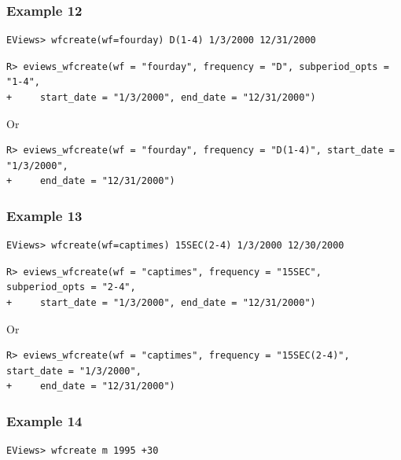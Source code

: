 \hypertarget{example-12-1}{%
\subsubsection{Example 12}\label{example-12-1}}

\begin{verbatim}
EViews> wfcreate(wf=fourday) D(1-4) 1/3/2000 12/31/2000
\end{verbatim}

\begin{verbatim}
R> eviews_wfcreate(wf = "fourday", frequency = "D", subperiod_opts = "1-4",
+     start_date = "1/3/2000", end_date = "12/31/2000")
\end{verbatim}

Or

\begin{verbatim}
R> eviews_wfcreate(wf = "fourday", frequency = "D(1-4)", start_date = "1/3/2000",
+     end_date = "12/31/2000")
\end{verbatim}

\hypertarget{example-13-1}{%
\subsubsection{Example 13}\label{example-13-1}}

\begin{verbatim}
EViews> wfcreate(wf=captimes) 15SEC(2-4) 1/3/2000 12/30/2000
\end{verbatim}

\begin{verbatim}
R> eviews_wfcreate(wf = "captimes", frequency = "15SEC", subperiod_opts = "2-4",
+     start_date = "1/3/2000", end_date = "12/31/2000")
\end{verbatim}

Or

\begin{verbatim}
R> eviews_wfcreate(wf = "captimes", frequency = "15SEC(2-4)", start_date = "1/3/2000",
+     end_date = "12/31/2000")
\end{verbatim}

\hypertarget{example-14-1}{%
\subsubsection{Example 14}\label{example-14-1}}

\begin{verbatim}
EViews> wfcreate m 1995 +30
\end{verbatim}

